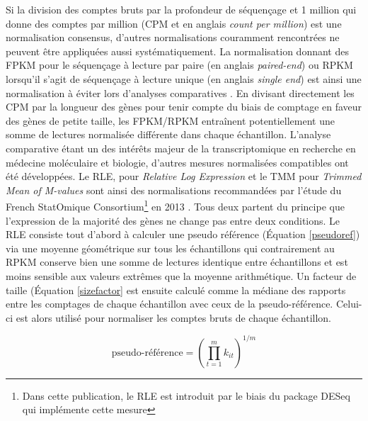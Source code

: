 Si la division des comptes bruts par la profondeur de séquençage et 1 million qui donne des comptes par million (CPM et en anglais \textit{count per million}) est une normalisation consensus, d'autres normalisations couramment rencontrées ne peuvent être appliquées aussi systématiquement. La normalisation donnant des FPKM pour le séquençage à lecture par paire (en anglais \textit{paired-end}) ou RPKM lorsqu'il s'agit de séquençage à lecture unique (en anglais \textit{single end}) est ainsi une normalisation à éviter lors d'analyses comparatives \cite{Wagner2012Dec}. En divisant directement les CPM par la longueur des gènes pour tenir compte du biais de comptage en faveur des gènes de petite taille, les FPKM/RPKM entraînent potentiellement une somme de lectures normalisée différente dans chaque échantillon. L'analyse comparative étant un des intérêts majeur de la transcriptomique en recherche en médecine moléculaire et biologie, d'autres mesures normalisées compatibles ont été développées. Le RLE, pour \textit{Relative Log Expression} \cite{Anders2010Oct} et le TMM pour \textit{Trimmed Mean of M-values} \cite{Robinson2010Mar} sont ainsi des normalisations recommandées par l'étude du French StatOmique Consortium\footnote{Dans cette publication, le RLE est introduit par le biais du package DESeq \cite{Anders2010Oct} qui implémente cette mesure} en 2013 \cite{Dillies2013Nov}. Tous deux partent du principe que l'expression de la majorité des gènes ne change pas entre deux conditions. Le RLE consiste tout d'abord à calculer une pseudo référence (Équation \ref{pseudoref}) via une moyenne géométrique sur tous les échantillons \cite{Gandolfo2018Feb} qui contrairement au RPKM conserve bien une somme de lectures identique entre échantillons et est moins sensible aux valeurs extrêmes que la moyenne arithmétique. Un facteur de taille (Équation \ref{sizefactor} est ensuite calculé comme la médiane des rapports entre les comptages de chaque échantillon avec ceux de la pseudo-référence. Celui-ci est alors utilisé pour normaliser les comptes bruts de chaque échantillon.

\begin{equation}\label{pseudoref}
    \text{pseudo-référence} = \left(\prod_{t=1}^{m} k_{i t}\right)^{1 / m}
\end{equation}

